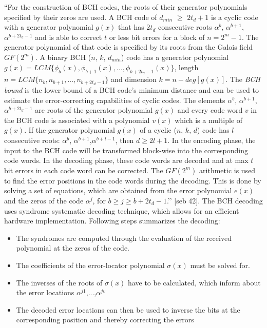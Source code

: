 ``For the construction of BCH codes, the roots of their generator polynomials specified by their zeros are used. A BCH code of $d_{min}$ $\geq$ $2t_d + 1$ is a cyclic code with a generator polynomial $g(x)$ that has $2t_d$ consecutive roots $\alpha^b$, $\alpha^{b+1}$,$\alpha^{b+2t_d-1}$ and is able to correct $t$ or less bit errors for a block of $n = 2^m - 1$. The generator polynomial of that code is specified by its roots from the Galois field $GF(2^m)$. A binary BCH ($n$, $k$, $d_{min}$) code
has a generator polynomial $g(x) = LCM\{\phi_{b}(x), \phi_{b+1}(x),...,\phi_{b+2t_{d}-1}(x)\}$, length $n = LCM\{n_b,n_{b+1},...,n_{b+2t_d-1}\}$ and dimension $k = n - deg[g(x)]$. The \emph{BCH bound} is the lower bound of a BCH code’s minimum distance and can be used to estimate the error-correcting capabilities of cyclic codes. The elements $\alpha^b$, $\alpha^{b+1}$,$\alpha^{b+2t_d-1}$ are roots of the generator polynomial $g(x)$ and every code word $v$ in the BCH code is associated with a
polynomial $v(x)$ which is a multiple of $g(x)$. If the generator polynomial $g(x)$ of a cyclic ($n$, $k$, $d$) code has $l$ consecutive roots: $\alpha^b$, $\alpha^{b+1}$,$\alpha^{b+l-1}$, then $d \geq 2l +1$. In the encoding phase, the input to the BCH code will be transformed block-wise into the corresponding code words. In the decoding phase, these code words are decoded and at max $t$ bit errors in each code word can be corrected. The $GF(2^m)$ arithmetic is used to find the error positions
in the code words during the decoding. This is done by solving a set of equations, which are obtained from the error polynomial $e(x)$ and the zeros of the code $\alpha^j$, for $b \geq j \geq b + 2t_d - 1$.’’ [seb 42]. The BCH decoding uses syndrome systematic decoding technique, which allows for an efficient hardware implementation. Following steps summarizes the decoding:

\begin{itemize}
\item The syndromes are computed through the evaluation of the received polynomial at the zeros of the code.
\item The coefficients of the error-locator polynomial $\sigma(x)$ must be solved for.
\item The inverses of the roots of $\sigma(x)$ have to be calculated, which inform about the error locations $\alpha^{j1}$,...,$\alpha^{jv}$
\item The decoded error locations can then be used to inverse the bits at the corresponding position and thereby correcting the errors
\end{itemize}

